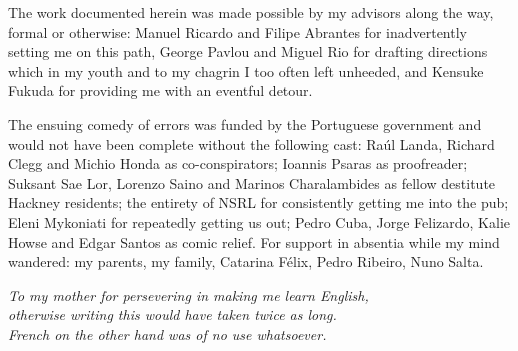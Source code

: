 \begin{acknowledgements}

The work documented herein was made possible by my advisors along the way, formal or otherwise: Manuel Ricardo and Filipe Abrantes for inadvertently setting me on this path, George Pavlou and Miguel Rio for drafting directions which in my youth and to my chagrin I too often left unheeded, and Kensuke Fukuda for providing me with an eventful detour.

The ensuing comedy of errors was funded by the Portuguese government and would not have been complete without the following cast: 
Ra\'{u}l Landa, Richard Clegg and Michio Honda as co-conspirators; 
Ioannis Psaras as proofreader;
Suksant Sae Lor, Lorenzo Saino and Marinos Charalambides as fellow destitute Hackney residents;
the entirety of NSRL for consistently getting me into the pub;
Eleni Mykoniati for repeatedly getting us out;
Pedro Cuba, Jorge Felizardo, Kalie Howse and Edgar Santos as comic relief.
For support in absentia while my mind wandered: my parents, my family, Catarina F\'{e}lix, Pedro Ribeiro, Nuno Salta.

\end{acknowledgements}

\hphantom{}\vfill
\newpage
\thispagestyle{empty}
\vspace*{1.75in}
\begin{flushright} 
\textit{
To my mother for persevering in making me learn English, \\
otherwise writing this would have taken twice as long. \\
French on the other hand was of no use whatsoever. \\
}
\end{flushright}



